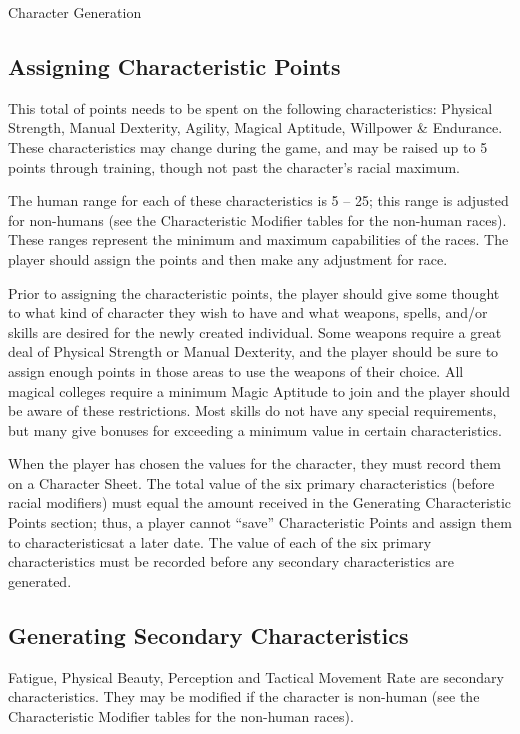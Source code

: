 \begin{Chapter}{Character Generation}
\subsection{Assigning Characteristic Points}

This total of points needs to be spent on the following
characteristics: Physical Strength, Manual Dexterity, Agility, Magical
Aptitude, Willpower \& Endurance.  These characteristics may change
during the game, and may be raised up to 5 points through training,
though not past the character’s racial maximum.

The human range for each of these characteristics is 5 -- 25; this
range is adjusted for non-humans (see the Characteristic Modifier
tables for the non-human races).  These ranges represent the minimum
and maximum capabilities of the races. The player should assign the
points and then make any adjustment for race.

Prior to assigning the characteristic points, the player should give
some thought to what kind of character they wish to have and what
weapons, spells, and/or skills are desired for the newly created
individual. Some weapons require a great deal of Physical Strength or
Manual Dexterity, and the player should be sure to assign enough
points in those areas to use the weapons of their choice.  All magical
colleges require a minimum Magic Aptitude to join and the player
should be aware of these restrictions.  Most skills do not have any
special requirements, but many give bonuses for exceeding a minimum
value in certain characteristics.

When the player has chosen the values for the character, they must
record them on a Character Sheet.  The total value of the six primary
characteristics (before racial modifiers) must equal the amount
received in the Generating Characteristic Points section; thus, a
player cannot “save” Characteristic Points and assign them to
characteristicsat a later date.  The value of each of the six primary
characteristics must be recorded before any secondary characteristics
are generated.

\subsection{Generating Secondary Characteristics}

Fatigue, Physical Beauty, Perception and Tactical Movement Rate are
secondary characteristics.  They may be modified if the character is
non-human (see the Characteristic Modifier tables for the non-human
races).


\end{Chapter}
